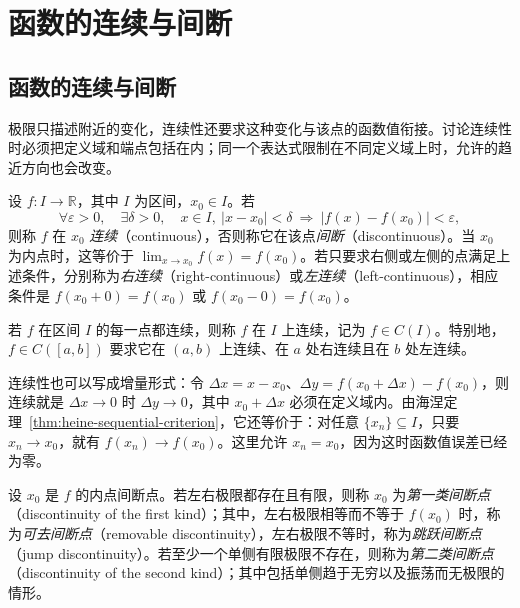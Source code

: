 \documentclass[UTF8,12pt,a4paper,fontset=fandol]{ctexbook}
\begin{document}
\section{函数的连续与间断}
\label{sec:continuity-and-discontinuity}

\subsection{函数的连续与间断}
\label{subsec:continuity-and-discontinuity}

极限只描述附近的变化，连续性还要求这种变化与该点的函数值衔接。讨论连续性时必须把定义域和端点包括在内；同一个表达式限制在不同定义域上时，允许的趋近方向也会改变。

\begin{definition}
\label{def:continuity-at-a-point-and-on-intervals}
设 $f:I\to\mathbb{R}$，其中 $I$ 为区间，$x_0\in I$。若
\begin{equation}
    \forall\varepsilon>0,\quad\exists\delta>0,\quad
    x\in I,\ |x-x_0|<\delta
    \ \Longrightarrow\ |f(x)-f(x_0)|<\varepsilon,
    \label{eq:epsilon-delta-continuity}
\end{equation}
则称 $f$ 在 $x_0$ \emph{连续}（continuous），否则称它在该点\emph{间断}（discontinuous）。当 $x_0$ 为内点时，这等价于 $\lim_{x\to x_0}f(x)=f(x_0)$。若只要求右侧或左侧的点满足上述条件，分别称为\emph{右连续}（right-continuous）或\emph{左连续}（left-continuous），相应条件是 $f(x_0+0)=f(x_0)$ 或 $f(x_0-0)=f(x_0)$。

若 $f$ 在区间 $I$ 的每一点都连续，则称 $f$ 在 $I$ 上连续，记为 $f\in C(I)$。特别地，$f\in C([a,b])$ 要求它在 $(a,b)$ 上连续、在 $a$ 处右连续且在 $b$ 处左连续。
\end{definition}

连续性也可以写成增量形式：令 $\Delta x=x-x_0$、$\Delta y=f(x_0+\Delta x)-f(x_0)$，则连续就是 $\Delta x\to0$ 时 $\Delta y\to0$，其中 $x_0+\Delta x$ 必须在定义域内。由海涅定理~\ref{thm:heine-sequential-criterion}，它还等价于：对任意 $\{x_n\}\subseteq I$，只要 $x_n\to x_0$，就有 $f(x_n)\to f(x_0)$。这里允许 $x_n=x_0$，因为这时函数值误差已经为零。

\begin{definition}
\label{def:classification-of-discontinuities}
设 $x_0$ 是 $f$ 的内点间断点。若左右极限都存在且有限，则称 $x_0$ 为\emph{第一类间断点}（discontinuity of the first kind）；其中，左右极限相等而不等于 $f(x_0)$ 时，称为\emph{可去间断点}（removable discontinuity），左右极限不等时，称为\emph{跳跃间断点}（jump discontinuity）。若至少一个单侧有限极限不存在，则称为\emph{第二类间断点}（discontinuity of the second kind）；其中包括单侧趋于无穷以及振荡而无极限的情形。
\end{definition}
\end{document}
